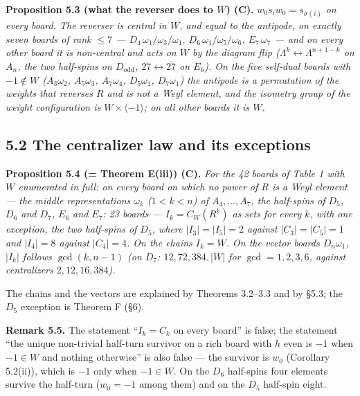 \documentclass[
]{article}
\begin{document}
\textbf{Proposition 5.3 (what the reverser does to \(W\)) (C).}
\emph{\(w_0 s_i w_0 = s_{\sigma(i)}\) on every board. The reverser is
central in \(W\), and equal to the antipode, on exactly seven boards of
rank \(\le 7\) --- \(D_4\,\omega_1/\omega_3/\omega_4\),
\(D_6\,\omega_1/\omega_5/\omega_6\), \(E_7\,\omega_7\) --- and on every
other board it is non-central and acts on \(W\) by the diagram flip
(\(\Lambda^k \leftrightarrow \Lambda^{n+1-k}\) on \(A_n\), the two
half-spins on \(D_{\mathrm{odd}}\), \(27 \leftrightarrow \overline{27}\)
on \(E_6\)). On the five self-dual boards with \(-1 \notin W\)
(\(A_3\omega_2\), \(A_5\omega_3\), \(A_7\omega_4\), \(D_5\omega_1\),
\(D_7\omega_1\)) the antipode is a permutation of the weights that
reverses \(R\) and is not a Weyl element, and the isometry group of the
weight configuration is \(W \times \langle -1 \rangle\); on all other
boards it is \(W\).}

\subsection{5.2 The centralizer law and its
exceptions}\label{the-centralizer-law-and-its-exceptions}

\textbf{Proposition 5.4 (= Theorem E(iii)) (C).} \emph{For the 42 boards
of Table 1 with \(W\) enumerated in full: on every board on which no
power of \(R\) is a Weyl element --- the middle representations
\(\omega_k\) (\(1 < k < n\)) of \(A_4, \dots, A_7\), the half-spins of
\(D_5\), \(D_6\) and \(D_7\), \(E_6\) and \(E_7\): 23 boards ---
\(I_k = C_W(R^k)\) as sets for every \(k\), with one exception, the two
half-spins of \(D_5\), where \(|I_3| = |I_5| = 2\) against
\(|C_3| = |C_5| = 1\) and \(|I_4| = 8\) against \(|C_4| = 4\). On the
chains \(I_k = W\). On the vector boards \(D_n\omega_1\), \(|I_k|\)
follows \(\gcd(k, n-1)\) (on \(D_7\): \(12, 72, 384, |W|\) for
\(\gcd = 1, 2, 3, 6\), against centralizers \(2, 12, 16, 384\)).}

The chains and the vectors are explained by Theorems 3.2--3.3 and by
§5.3; the \(D_5\) exception is Theorem F (§6).

\textbf{Remark 5.5.} The statement ``\(I_k = C_k\) on every board'' is
false; the statement ``the unique non-trivial half-turn survivor on a
rich board with \(h\) even is \(-1\) when \(-1 \in W\) and nothing
otherwise'' is also false --- the survivor is \(w_0\) (Corollary
5.2(ii)), which is \(-1\) only when \(-1 \in W\). On the \(D_6\)
half-spins four elements survive the half-turn (\(w_0 = -1\) among them)
and on the \(D_5\) half-spin eight.
\end{document}
